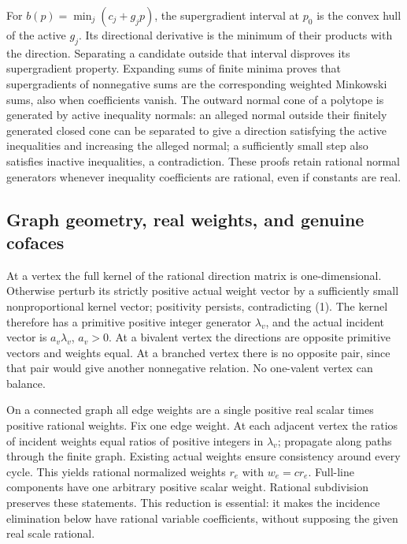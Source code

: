 \documentclass[
  11pt,
]{article}
\begin{document}
For \(b(p)=\min_j(c_j+g_jp)\), the supergradient interval at \(p_0\) is
the convex hull of the active \(g_j\). Its directional derivative is the
minimum of their products with the direction. Separating a candidate
outside that interval disproves its supergradient property. Expanding
sums of finite minima proves that supergradients of nonnegative sums are
the corresponding weighted Minkowski sums, also when coefficients
vanish. The outward normal cone of a polytope is generated by active
inequality normals: an alleged normal outside their finitely generated
closed cone can be separated to give a direction satisfying the active
inequalities and increasing the alleged normal; a sufficiently small
step also satisfies inactive inequalities, a contradiction. These proofs
retain rational normal generators whenever inequality coefficients are
rational, even if constants are real.

\subsection{Graph geometry, real weights, and genuine
cofaces}\label{graph-geometry-real-weights-and-genuine-cofaces}

At a vertex the full kernel of the rational direction matrix is
one-dimensional. Otherwise perturb its strictly positive actual weight
vector by a sufficiently small nonproportional kernel vector; positivity
persists, contradicting (1). The kernel therefore has a primitive
positive integer generator \(\lambda_v\), and the actual incident vector
is \(a_v\lambda_v\), \(a_v>0\). At a bivalent vertex the directions are
opposite primitive vectors and weights equal. At a branched vertex there
is no opposite pair, since that pair would give another nonnegative
relation. No one-valent vertex can balance.

On a connected graph all edge weights are a single positive real scalar
times positive rational weights. Fix one edge weight. At each adjacent
vertex the ratios of incident weights equal ratios of positive integers
in \(\lambda_v\); propagate along paths through the finite graph.
Existing actual weights ensure consistency around every cycle. This
yields rational normalized weights \(r_e\) with \(w_e=c r_e\). Full-line
components have one arbitrary positive scalar weight. Rational
subdivision preserves these statements. This reduction is essential: it
makes the incidence elimination below have rational variable
coefficients, without supposing the given real scale rational.
\end{document}
